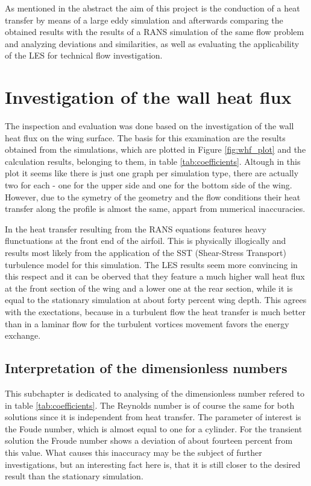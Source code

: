 As mentioned in the abstract the aim of this project is the conduction of a heat transfer by means of a large eddy simulation and afterwards comparing the obtained results with the results of a RANS simulation of the same flow problem and analyzing deviations and similarities, as well as evaluating the applicability of the LES for technical flow investigation.
\section{Investigation of the wall heat flux}
The inspection and evaluation was done based on the investigation of the wall heat flux on the wing surface. The basis for this examination are the results obtained from the simulations, which are plotted in Figure \ref{fig:whf_plot} and the calculation results, belonging to them, in table \ref{tab:coefficients}. Altough in this plot it seems like there is just one graph per simulation type, there are actually two for each - one for the upper side and one for the bottom side of the wing. However, due to the symetry of the geometry and the flow conditions their heat transfer along the profile is almost the same, appart from numerical inaccuracies.
	
In the heat transfer resulting from the RANS equations features heavy flunctuations at the front end of the airfoil. This is physically illogically and results most likely from the application of the SST (Shear-Stress Transport) turbulence model for this simulation. The LES results seem more convincing in this respect and it can be oberved that they feature a much higher wall heat flux at the front section of the wing and a lower one at the rear section, while it is equal to the stationary simulation at about forty percent wing depth. This agrees with the exectations, because in a turbulent flow the heat transfer is much better than in a laminar flow for the turbulent vortices movement favors the energy exchange.
\subsection{Interpretation of the dimensionless numbers}
This subchapter is dedicated to analysing of the dimensionless number refered to in table \ref{tab:coefficients}. The Reynolds number is of course the same for both solutions since it is independent from heat transfer.
The parameter of interest is the Foude number, which is almost equal to one for a cylinder. For the transient solution the Froude number shows a deviation of about fourteen percent from this value. What causes this inaccuracy may be the subject of further investigations, but an interesting fact here is, that it is still closer to the desired result than the stationary simulation.
